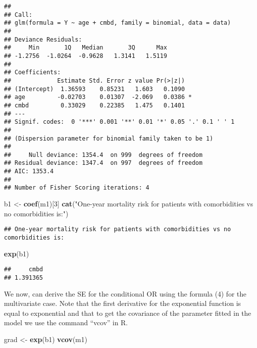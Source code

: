 \documentclass[]{article}
\newenvironment{Shaded}{\begin{snugshade}}{\end{snugshade}}
\newcommand{\DecValTok}[1]{\textcolor[rgb]{0.00,0.00,0.81}{#1}}
\newcommand{\KeywordTok}[1]{\textcolor[rgb]{0.13,0.29,0.53}{\textbf{#1}}}
\newcommand{\NormalTok}[1]{#1}
\newcommand{\StringTok}[1]{\textcolor[rgb]{0.31,0.60,0.02}{#1}}
\begin{document}
\begin{verbatim}
## 
## Call:
## glm(formula = Y ~ age + cmbd, family = binomial, data = data)
## 
## Deviance Residuals: 
##     Min       1Q   Median       3Q      Max  
## -1.2756  -1.0264  -0.9628   1.3141   1.5119  
## 
## Coefficients:
##             Estimate Std. Error z value Pr(>|z|)  
## (Intercept)  1.36593    0.85231   1.603   0.1090  
## age         -0.02703    0.01307  -2.069   0.0386 *
## cmbd         0.33029    0.22385   1.475   0.1401  
## ---
## Signif. codes:  0 '***' 0.001 '**' 0.01 '*' 0.05 '.' 0.1 ' ' 1
## 
## (Dispersion parameter for binomial family taken to be 1)
## 
##     Null deviance: 1354.4  on 999  degrees of freedom
## Residual deviance: 1347.4  on 997  degrees of freedom
## AIC: 1353.4
## 
## Number of Fisher Scoring iterations: 4
\end{verbatim}

\begin{Shaded}
\begin{Highlighting}[]
\NormalTok{b1 <-}\StringTok{ }\KeywordTok{coef}\NormalTok{(m1)[}\DecValTok{3}\NormalTok{]}
\KeywordTok{cat}\NormalTok{(}\StringTok{"One-year mortality risk for patients with comorbidities vs no comorbidities is:"}\NormalTok{) }
\end{Highlighting}
\end{Shaded}

\begin{verbatim}
## One-year mortality risk for patients with comorbidities vs no comorbidities is:
\end{verbatim}

\begin{Shaded}
\begin{Highlighting}[]
\KeywordTok{exp}\NormalTok{(b1)}
\end{Highlighting}
\end{Shaded}

\begin{verbatim}
##     cmbd 
## 1.391365
\end{verbatim}

We now, can derive the SE for the conditional OR using the formula (4)
for the multivariate case. Note that the first derivative for the
exponential function is equal to exponential and that to get the
covariance of the parameter fitted in the model we use the command
``vcov'' in R.

\begin{Shaded}
\begin{Highlighting}[]
\NormalTok{grad <-}\StringTok{ }\KeywordTok{exp}\NormalTok{(b1)}
\KeywordTok{vcov}\NormalTok{(m1)}
\end{Highlighting}
\end{Shaded}
\end{document}
